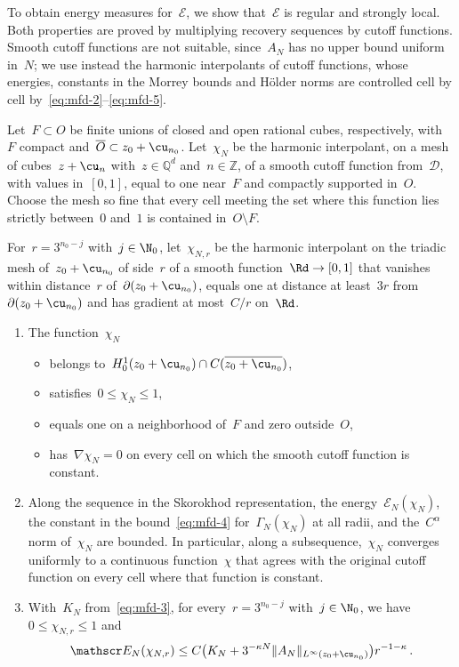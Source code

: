 \documentclass[11pt]{amsart}
\begin{document}
To obtain energy measures for~$\mathscr E$, we show that~$\mathscr E$ is regular and strongly local. Both properties are proved by multiplying recovery sequences by cutoff functions. Smooth cutoff functions are not suitable, since~$A_N$ has no upper bound uniform in~$N$; we use instead the harmonic interpolants of cutoff functions, whose energies, constants in the Morrey bounds and H\"older norms are controlled cell by cell by~\eqref{eq:mfd-2}--\eqref{eq:mfd-5}.

Let~$F\subset O$ be finite unions of closed and open rational cubes, respectively, with~$F$ compact and~$\overline O\subset z_0+\cu_{n_0}$. Let~$\chi_N$ be the harmonic interpolant, on a mesh of cubes~$z+\cu_n$ with~$z\in\mathbb Q^d$ and~$n\in\mathbb Z$, of a smooth cutoff function from~$\mathcal D$, with values in~$[0,1]$, equal to one near~$F$ and compactly supported in~$O$. Choose the mesh so fine that every cell meeting the set where this function lies strictly between~$0$ and~$1$ is contained in~$O\setminus F$.

For~$r=3^{n_0-j}$ with~$j\in\N_0$, let~$\chi_{N,r}$ be the harmonic interpolant on the triadic mesh of~$z_0+\cu_{n_0}$ of side~$r$ of a smooth function~$\Rd\to[0,1]$ that vanishes within distance~$r$ of~$\partial(z_0+\cu_{n_0})$, equals one at distance at least~$3r$ from~$\partial(z_0+\cu_{n_0})$ and has gradient at most~$C/r$ on~$\Rd$.

\begin{lemma}
\label{mfd:lem-cutoffs}
\begin{enumerate}[label=(\roman*)]
\item The function~$\chi_N$
\begin{itemize}
\item belongs to~$H^1_0(z_0+\cu_{n_0})\cap C(\overline{z_0+\cu_{n_0}})$,
\item satisfies~$0\leq\chi_N\leq1$,
\item equals one on a neighborhood of~$F$ and zero outside~$O$,
\item has~$\nabla\chi_N=0$ on every cell on which the smooth cutoff function is constant.
\end{itemize}
\item Along the sequence in the Skorokhod representation, the energy~$\mathscr E_N(\chi_N)$, the constant in the bound~\eqref{eq:mfd-4} for~$\Gamma_N(\chi_N)$ at all radii, and the~$C^\alpha$ norm of~$\chi_N$ are bounded. In particular, along a subsequence,~$\chi_N$ converges uniformly to a continuous function~$\chi$ that agrees with the original cutoff function on every cell where that function is constant.
\item With~$K_N$ from~\eqref{eq:mfd-3}, for every~$r=3^{n_0-j}$ with~$j\in\N_0$, we have~$0\leq\chi_{N,r}\leq1$ and
\begin{equation*}
	\mathscr E_N(\chi_{N,r})\leq C\bigl(K_N+3^{-\kappa N}\|A_N\|_{L^\infty(z_0+\cu_{n_0})}\bigr)r^{-1-\kappa}\,.
\end{equation*}
\end{enumerate}
\end{lemma}
\end{document}
